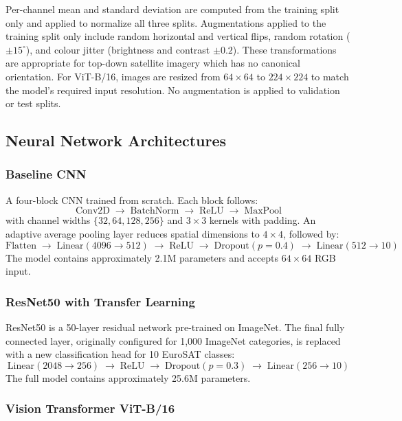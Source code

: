 \documentclass[12pt, letterpaper]{article}
\begin{document}
Per-channel mean and standard deviation are computed from the training split only and applied to normalize all three splits. Augmentations applied to the training split only include random horizontal and vertical flips, random rotation ($\pm 15^\circ$), and colour jitter (brightness and contrast $\pm 0.2$). These transformations are appropriate for top-down satellite imagery which has no canonical orientation. For ViT-B/16, images are resized from $64 \times 64$ to $224 \times 224$ to match the model's required input resolution. No augmentation is applied to validation or test splits.

\subsection{Neural Network Architectures}

\subsubsection{Baseline CNN}

A four-block CNN trained from scratch. Each block follows:
\[
    \text{Conv2D} \;\rightarrow\; \text{BatchNorm} \;\rightarrow\;
    \text{ReLU} \;\rightarrow\; \text{MaxPool}
\]
with channel widths $\{32, 64, 128, 256\}$ and $3 \times 3$ kernels with padding. An
adaptive average pooling layer reduces spatial dimensions to $4 \times 4$, followed by:
\[
    \text{Flatten} \;\rightarrow\; \text{Linear}(4096 \to 512) \;\rightarrow\;
    \text{ReLU} \;\rightarrow\; \text{Dropout}(p{=}0.4) \;\rightarrow\;
    \text{Linear}(512 \to 10)
\]
The model contains approximately 2.1M parameters and accepts $64 \times 64$ RGB input.

\subsubsection{ResNet50 with Transfer Learning}

ResNet50 \cite{he2016resnet} is a 50-layer residual network pre-trained on ImageNet.
The final fully connected layer, originally configured for 1,000 ImageNet categories, is replaced with a new classification head for 10 EuroSAT classes:
\[
    \text{Linear}(2048 \to 256) \;\rightarrow\; \text{ReLU} \;\rightarrow\;
    \text{Dropout}(p{=}0.3) \;\rightarrow\; \text{Linear}(256 \to 10)
\]
The full model contains approximately 25.6M parameters.

\subsubsection{Vision Transformer ViT-B/16}
\end{document}
